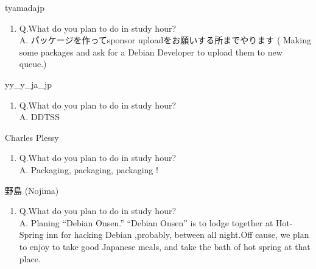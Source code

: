 \begin{prework}{ tyamadajp }
  \begin{enumerate}
  \item Q.What do you plan to do in study hour?\\
    A. パッケージを作ってsponsor uploadをお願いする所までやります ( Making some packages and  ask for a Debian Developer to upload them to new queue.)
  \end{enumerate}
\end{prework}

\begin{prework}{ yy\_y\_ja\_jp }
  \begin{enumerate}
  \item Q.What do you plan to do in study hour?\\
    A. DDTSS
  \end{enumerate}
\end{prework}

\begin{prework}{ Charles Plessy }
  \begin{enumerate}
  \item Q.What do you plan to do in study hour?\\
    A. Packaging, packaging, packaging !
  \end{enumerate}
\end{prework}

\begin{prework}{ 野島 (Nojima)}
  \begin{enumerate}
  \item Q.What do you plan to do in study hour?\\
    A. Planing ``Debian Onsen.'' ``Debian Onsen'' is to lodge together at Hot-Spring inn for hacking Debian ,probably, between all night.Off cause, we plan to enjoy to take good Japanese meals, and take the bath of hot spring at that place.
  \end{enumerate}
\end{prework}

